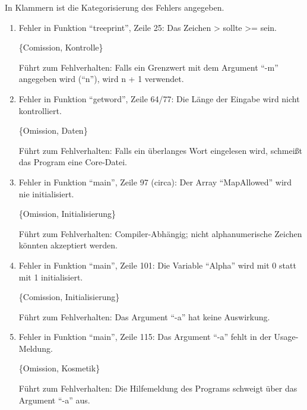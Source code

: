 
In Klammern ist die Kategorisierung des Fehlers angegeben.

\begin{enumerate}

\item Fehler in Funktion ``treeprint'', Zeile 25: Das Zeichen > sollte >= sein.

\{Comission, Kontrolle\}

F\"uhrt zum Fehlverhalten:
Falls ein Grenzwert mit dem Argument ``-m'' 
angegeben wird (``n''), wird n + 1 verwendet.


\item Fehler in Funktion ``getword'', Zeile 64/77: Die L\"ange der
Eingabe wird nicht kontrolliert. 

\{Omission, Daten\}

F\"uhrt zum Fehlverhalten:
Falls ein \"uberlanges Wort eingelesen wird,
schmei{\ss}t das Program eine Core-Datei.


\item Fehler in Funktion ``main'', Zeile 97 (circa): Der Array
``MapAllowed'' wird nie initialisiert. 

\{Omission, Initialisierung\}

F\"uhrt zum Fehlverhalten:  Compiler-Abh\"angig; nicht alphanumerische
Zeichen k\"onnten akzeptiert werden.


\item Fehler in Funktion ``main'', Zeile 101: Die Variable ``Alpha''
wird mit 0 statt mit 1 initialisiert.  

\{Comission, Initialisierung\}

F\"uhrt zum Fehlverhalten:
Das Argument ``-a'' hat keine Auswirkung.


\item Fehler in Funktion ``main'', Zeile 115: Das Argument ``-a''
fehlt in der Usage-Meldung. 

\{Omission, Kosmetik\}

F\"uhrt zum Fehlverhalten:
Die Hilfemeldung des Programs schweigt \"uber das Argument ``-a'' aus. 

\end{enumerate}

